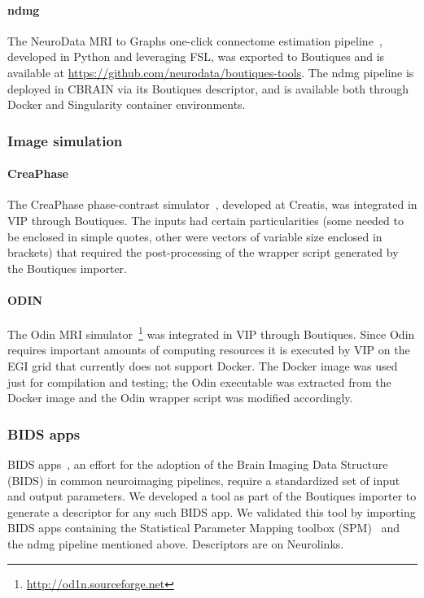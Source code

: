 \documentclass[a4paper,num-refs]{oup-contemporary}
\newcommand{\boutiques}{Boutiques\xspace}
\begin{document}
\paragraph{ndmg} The NeuroData MRI to Graphs one-click connectome estimation
pipeline~\cite{kiar2017comprehensive}, developed in Python and leveraging FSL, was
exported to \boutiques and is available at \url{https://github.com/neurodata/boutiques-tools}.
The ndmg pipeline is deployed in CBRAIN via its \boutiques descriptor, and is available
both through Docker and Singularity container environments.

\subsubsection{Image simulation}

\paragraph{CreaPhase}
The CreaPhase phase-contrast simulator~\cite{WEBE-17}, developed at
Creatis, was integrated in VIP through \boutiques. The inputs had
certain particularities (some needed to be enclosed in simple quotes,
other were vectors of variable size enclosed in brackets) that
required the post-processing of the wrapper script generated by the
\boutiques importer.

\paragraph{ODIN} The Odin MRI simulator~\cite{jochimsen2004odin}\footnote{\url{http://od1n.sourceforge.net}} was integrated
in VIP through \boutiques. Since Odin requires important amounts of
computing resources it is executed by VIP on the EGI grid that
currently does not support Docker. The Docker image was used just for
compilation and testing; the Odin executable was extracted from the
Docker image and the Odin wrapper script was modified accordingly.

\subsubsection{BIDS apps}

BIDS apps~\cite{gorgolewski2017bids}, an effort for the adoption of
the Brain Imaging Data Structure (BIDS) in common neuroimaging
pipelines, require a standardized set of input and output
parameters. We developed a tool as part of the \boutiques importer to
generate a descriptor for any such BIDS app. We validated this tool by
importing BIDS apps containing the Statistical Parameter Mapping
toolbox (SPM)~\cite{penny2011statistical} and the ndmg pipeline
mentioned above. Descriptors are on Neurolinks.
\end{document}

